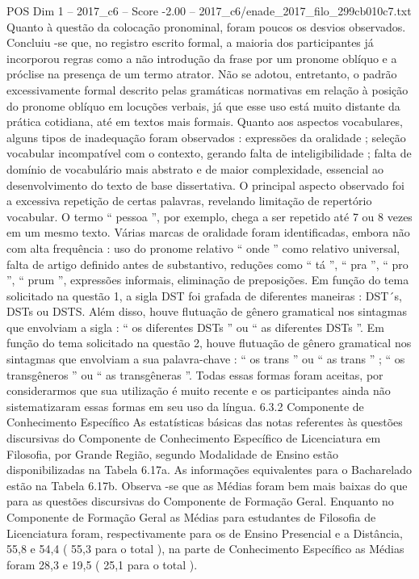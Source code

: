 \begin{textsample}{POS Dim 1 – 2017\_c6 – Score -2.00 – 2017\_c6/enade\_2017\_filo\_299cb010c7.txt}
Quanto à questão da colocação pronominal, foram poucos os desvios observados.
Concluiu -se que, no registro escrito formal, a maioria dos participantes já incorporou regras como a não introdução da frase por um pronome oblíquo e a próclise na presença de um termo atrator.
Não se adotou, entretanto, o padrão excessivamente formal descrito pelas gramáticas normativas em relação à posição do pronome oblíquo em locuções verbais, já que esse uso está muito distante da prática cotidiana, até em textos mais formais.
Quanto aos aspectos vocabulares, alguns tipos de inadequação foram observados : expressões da oralidade ; seleção vocabular incompatível com o contexto, gerando falta de inteligibilidade ; falta de domínio de vocabulário mais abstrato e de maior complexidade, essencial ao desenvolvimento do texto de base dissertativa.
O principal aspecto observado foi a excessiva repetição de certas palavras, revelando limitação de repertório vocabular.
O termo “ pessoa ”, por exemplo, chega a ser repetido até 7 ou 8 vezes em um mesmo texto.
Várias marcas de oralidade foram identificadas, embora não com alta frequência : uso do pronome relativo “ onde ” como relativo universal, falta de artigo definido antes de substantivo, reduções como “ tá ”, “ pra ”, “ pro ”, “ prum ”, expressões informais, eliminação de preposições.
Em função do tema solicitado na questão 1, a sigla DST foi grafada de diferentes maneiras : DST´s, DSTs ou DSTS.
Além disso, houve flutuação de gênero gramatical nos sintagmas que envolviam a sigla : “ os diferentes DSTs ” ou “ as diferentes DSTs ”.
Em função do tema solicitado na questão 2, houve flutuação de gênero gramatical nos sintagmas que envolviam a sua palavra-chave : “ os trans ” ou “ as trans ” ; “ os transgêneros ” ou “ as transgêneras ”.
Todas essas formas foram aceitas, por considerarmos que sua utilização é muito recente e os participantes ainda não sistematizaram essas formas em seu uso da língua. 6.3.2 Componente de Conhecimento Específico As estatísticas básicas das notas referentes às questões discursivas do Componente de Conhecimento Específico de Licenciatura em Filosofia, por Grande Região, segundo Modalidade de Ensino estão disponibilizadas na Tabela 6.17a.
As informações equivalentes para o Bacharelado estão na Tabela 6.17b.
Observa -se que as Médias foram bem mais baixas do que para as questões discursivas do Componente de Formação Geral.
Enquanto no Componente de Formação Geral as Médias para estudantes de Filosofia de Licenciatura foram, respectivamente para os de Ensino Presencial e a Distância, 55,8 e 54,4 ( 55,3 para o total ), na parte de Conhecimento Específico as Médias foram 28,3 e 19,5 ( 25,1 para o total ).

\end{textsample}
